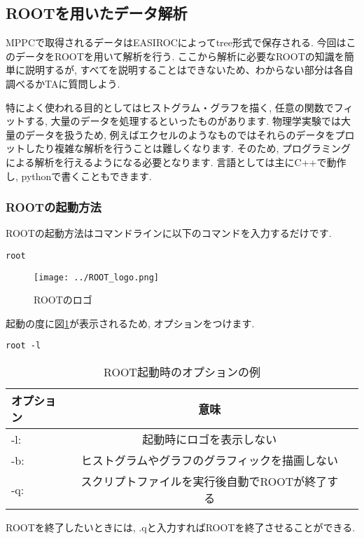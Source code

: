 \subsection{ROOTを用いたデータ解析}
MPPCで取得されるデータはEASIROCによってtree形式で保存される.
今回はこのデータをROOTを用いて解析を行う.
ここから解析に必要なROOTの知識を簡単に説明するが, すべてを説明することはできないため、わからない部分は各自調べるかTAに質問しよう.

特によく使われる目的としてはヒストグラム・グラフを描く, 任意の関数でフィットする, 大量のデータを処理するといったものがあります.
物理学実験では大量のデータを扱うため, 例えばエクセルのようなものではそれらのデータをプロットしたり複雑な解析を行うことは難しくなります.
そのため, プログラミングによる解析を行えるようになる必要となります.
言語としては主にC++で動作し, pythonで書くこともできます.

\subsubsection{ROOTの起動方法}
ROOTの起動方法はコマンドラインに以下のコマンドを入力するだけです.
\begin{lstlisting}
root
\end{lstlisting}
\begin{figure}[ht]
  \begin{center}
    \texttt{[image: ../ROOT\_logo.png]}
    \caption{ROOTのロゴ}
    \label{fig:ROOT_logo}
  \end{center}
\end{figure}
起動の度に図\ref{fig:ROOT_logo}が表示されるため, オプションをつけます.
\begin{lstlisting}
root -l
\end{lstlisting}
\begin{table}[ht]
  \caption{ROOT起動時のオプションの例}
  \centering
  \begin{tabular}{lcr}
    \hline
    オプション & 意味                                           \\
    \hline \hline
    -l:        & 起動時にロゴを表示しない                       \\
    -b:        & ヒストグラムやグラフのグラフィックを描画しない \\
    -q:        & スクリプトファイルを実行後自動でROOTが終了する \\
    \hline
  \end{tabular}
\end{table}
ROOTを終了したいときには, .qと入力すればROOTを終了させることができる.

